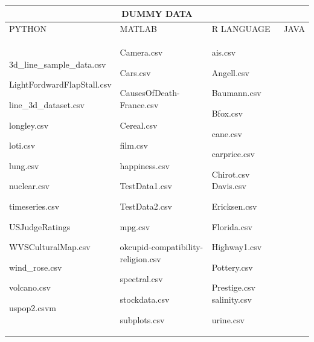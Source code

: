 \documentclass[12pt, a4paper,oneside]{report}
\begin{document}
\begin{table}[h]
	\centering {} \small
	\begin{tabular}{|p{5cm}|p{3cm}|p{3cm}|p{4cm}|}
		
		 \hline
		 \multicolumn{4}{|c|}{DUMMY DATA} \\
		 \hline
				
		PYTHON & MATLAB & R LANGUAGE & JAVA\\ \hline
		
		3d\_line\_sample\_data.csv \par LightFordwardFlapStall.csv  \par line\_3d\_dataset.csv \par
		longley.csv  \par loti.csv  \par lung.csv  \par nuclear.csv  \par timeseries.csv  \par
		USJudgeRatings	\par WVSCulturalMap.csv  \par wind\_rose.csv  \par volcano.csv  \par uspop2.csvm &
		
		Camera.csv \par Cars.csv \par CausesOfDeath-France.csv \par Cereal.csv \par film.csv \par happiness.csv \par TestData1.csv \par TestData2.csv  \par mpg.csv \par okcupid-compatibility-religion.csv  \par spectral.csv
		\par stockdata.csv \par subplots.csv  & 
		
		ais.csv \par Angell.csv  \par Baumann.csv \par Bfox.csv \par cane.csv \par carprice.csv \par Chirot.csv
		Davis.csv \par Ericksen.csv \par Florida.csv \par Highway1.csv \par Pottery.csv \par Prestige.csv 
		salinity.csv \par urine.csv & 
		

\end{tabular}
\end{table}
\end{document}
